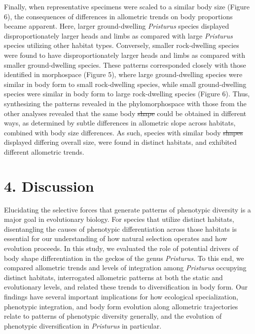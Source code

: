 \documentclass[
  11pt,
]{article}
\providecommand{\DIFaddtex}[1]{{\protect\color{blue}\uwave{#1}}} %
\providecommand{\DIFdeltex}[1]{{\protect\color{red}\sout{#1}}}                      %
\providecommand{\DIFaddbegin}{} %
\providecommand{\DIFaddend}{} %
\providecommand{\DIFdelbegin}{} %
\providecommand{\DIFdelend}{} %
\providecommand{\DIFadd}[1]{\texorpdfstring{\DIFaddtex{#1}}{#1}} %
\providecommand{\DIFdel}[1]{\texorpdfstring{\DIFdeltex{#1}}{}} %
\newcommand{\DIFscaledelfig}{0.5}
\newlength{\DIFdelgraphicswidth} %
\newlength{\DIFdelgraphicsheight} %
\newcommand{\DIFaddincludegraphics}[2][]{{\color{blue}\fbox{\DIFOincludegraphics[#1]{#2}}}} %
\newcommand{\DIFdelincludegraphics}[2][]{%
\sbox{\DIFdelgraphicsbox}{\DIFOincludegraphics[#1]{#2}}%
\settoboxwidth{\DIFdelgraphicswidth}{\DIFdelgraphicsbox} %
\settoboxtotalheight{\DIFdelgraphicsheight}{\DIFdelgraphicsbox} %
\scalebox{\DIFscaledelfig}{%
\parbox[b]{\DIFdelgraphicswidth}{\usebox{\DIFdelgraphicsbox}\\[-\baselineskip] \rule{\DIFdelgraphicswidth}{0em}}\llap{\resizebox{\DIFdelgraphicswidth}{\DIFdelgraphicsheight}{%
\setlength{\unitlength}{\DIFdelgraphicswidth}%
\begin{picture}(1,1)%
\thicklines\linethickness{2pt} %
{\color[rgb]{1,0,0}\put(0,0){\framebox(1,1){}}}%
{\color[rgb]{1,0,0}\put(0,0){\line( 1,1){1}}}%
{\color[rgb]{1,0,0}\put(0,1){\line(1,-1){1}}}%
\end{picture}%
}\hspace*{3pt}}} %
} %
\DeclareRobustCommand{\DIFaddbegin}{\DIFOaddbegin \let\includegraphics\DIFaddincludegraphics} %
\DeclareRobustCommand{\DIFaddend}{\DIFOaddend \let\includegraphics\DIFOincludegraphics} %
\DeclareRobustCommand{\DIFdelbegin}{\DIFOdelbegin \let\includegraphics\DIFdelincludegraphics} %
\DeclareRobustCommand{\DIFdelend}{\DIFOaddend \let\includegraphics\DIFOincludegraphics} %
\begin{document}
Finally, when representative specimens were scaled to a similar body
size (Figure 6), the consequences of differences in allometric trends on
body proportions became apparent. Here, larger ground-dwelling
\emph{Pristurus} species displayed disproportionately larger heads and
limbs as compared with large \emph{Pristurus} species utilizing other
habitat types. Conversely, smaller rock-dwelling species were found to
have disproportionately larger heads and limbs as compared with smaller
ground-dwelling species. These patterns corresponded closely with those
identified in morphospace (Figure 5), where large ground-dwelling
species were similar in body form to small rock-dwelling species, while
small ground-dwelling species were similar in body form to large
rock-dwelling species (Figure 6). Thus, synthesizing the patterns
revealed in the phylomorphospace with those from the other analyses
revealed that the same body \DIFdelbegin \DIFdel{shape }\DIFdelend \DIFaddbegin \DIFadd{proportions }\DIFaddend could be obtained in different
ways, as determined by subtle differences in allometric slope across
habitats, combined with body size differences. As such, species with
similar body \DIFdelbegin \DIFdel{shapes }\DIFdelend \DIFaddbegin \DIFadd{proportinos }\DIFaddend displayed differing overall size, were found in
distinct habitats, and exhibited different allometric trends.
\hfill\break

\hypertarget{discussion}{%
\section{4. Discussion}\label{discussion}}

Elucidating the selective forces that generate patterns of phenotypic
diversity is a major goal in evolutionary biology. For species that
utilize distinct habitats, disentangling the causes of phenotypic
differentiation across those habitats is essential for our understanding
of how natural selection operates and how evolution proceeds. In this
study, we evaluated the role of potential drivers of \DIFaddbegin \textbf{\DIFadd{CHANGE}}\DIFaddend body
shape differentiation in the geckos of the genus \emph{Pristurus}. To
this end, we compared allometric trends and levels of integration among
\emph{Pristurus} occupying distinct habitats, interrogated allometric
patterns at both the static and evolutionary levels, and related these
trends to diversification in body form. Our findings have several
important implications for how ecological specialization, phenotypic
integration, and body form evolution along allometric trajectories
relate to patterns of phenotypic diversity generally, and the evolution
of phenotypic diversification in \emph{Pristurus} in particular.
\hfill\break
\end{document}
